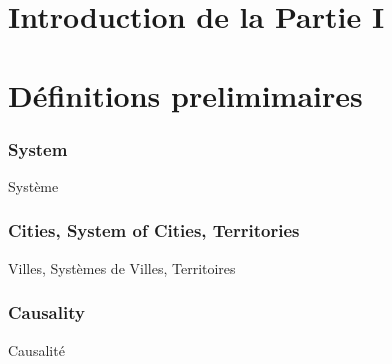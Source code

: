 

\chapter*{Introduction de la Partie I}


























\chapter*{Définitions prelimimaires}


\subsection*{System}{Système}



\subsection*{Cities, System of Cities, Territories}{Villes, Systèmes de Villes, Territoires}




\subsection*{Causality}{Causalité}













